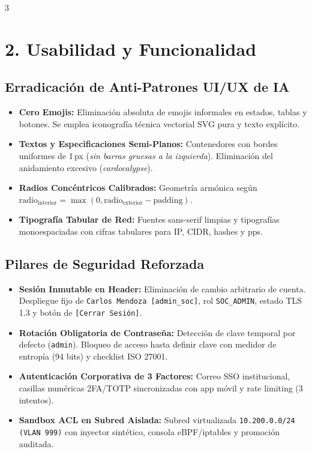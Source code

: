 \documentclass[11pt]{article}
\begin{document}
\begin{multicols}{3}
\columnbreak

\section*{\color{primarydark}\Large 2. Usabilidad y Funcionalidad}

\subsection*{\color{primary}Erradicación de Anti-Patrones UI/UX de IA}
\begin{itemize}[leftmargin=12bp, itemsep=2bp]
    \item \textbf{Cero Emojis:} Eliminación absoluta de emojis informales en estados, tablas y botones. Se emplea iconografía técnica vectorial SVG pura y texto explícito.
    \item \textbf{Textos y Especificaciones Semi-Planos:} Contenedores con bordes uniformes de 1\,px (\emph{sin barras gruesas a la izquierda}). Eliminación del anidamiento excesivo (\emph{cardocalypse}).
    \item \textbf{Radios Concéntricos Calibrados:} Geometría armónica según $\text{radio}_{\text{interior}} = \max(0, \text{radio}_{\text{exterior}} - \text{padding})$.
    \item \textbf{Tipografía Tabular de Red:} Fuentes sans-serif limpias y tipografías monoespaciadas con cifras tabulares para IP, CIDR, hashes y pps.
\end{itemize}

\subsection*{\color{primary}Pilares de Seguridad Reforzada}
\begin{itemize}[leftmargin=12bp, itemsep=2bp]
    \item \textbf{Sesión Inmutable en Header:} Eliminación de cambio arbitrario de cuenta. Despliegue fijo de \texttt{Carlos Mendoza [admin\_soc]}, rol \texttt{SOC\_ADMIN}, estado TLS 1.3 y botón de \texttt{[Cerrar Sesión]}.
    \item \textbf{Rotación Obligatoria de Contraseña:} Detección de clave temporal por defecto (\texttt{admin}). Bloqueo de acceso hasta definir clave con medidor de entropía (94 bits) y checklist ISO 27001.
    \item \textbf{Autenticación Corporativa de 3 Factores:} Correo SSO institucional, casillas numéricas 2FA/TOTP sincronizadas con app móvil y rate limiting (3 intentos).
    \item \textbf{Sandbox ACL en Subred Aislada:} Subred virtualizada \texttt{10.200.0.0/24 (VLAN 999)} con inyector sintético, consola eBPF/iptables y promoción auditada.
\end{itemize}


\end{multicols}
\end{document}

